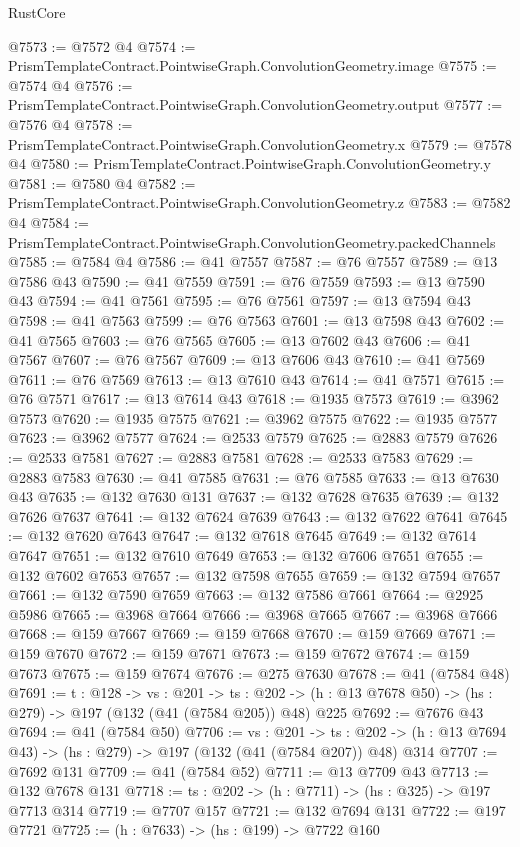 \begin{lexlean}{RustCore}
\begin{coremodule}
@7573 := @7572 @4
@7574 := PrismTemplateContract.PointwiseGraph.ConvolutionGeometry.image
@7575 := @7574 @4
@7576 := PrismTemplateContract.PointwiseGraph.ConvolutionGeometry.output
@7577 := @7576 @4
@7578 := PrismTemplateContract.PointwiseGraph.ConvolutionGeometry.x
@7579 := @7578 @4
@7580 := PrismTemplateContract.PointwiseGraph.ConvolutionGeometry.y
@7581 := @7580 @4
@7582 := PrismTemplateContract.PointwiseGraph.ConvolutionGeometry.z
@7583 := @7582 @4
@7584 := PrismTemplateContract.PointwiseGraph.ConvolutionGeometry.packedChannels
@7585 := @7584 @4
@7586 := @41 @7557
@7587 := @76 @7557
@7589 := @13 @7586 @43
@7590 := @41 @7559
@7591 := @76 @7559
@7593 := @13 @7590 @43
@7594 := @41 @7561
@7595 := @76 @7561
@7597 := @13 @7594 @43
@7598 := @41 @7563
@7599 := @76 @7563
@7601 := @13 @7598 @43
@7602 := @41 @7565
@7603 := @76 @7565
@7605 := @13 @7602 @43
@7606 := @41 @7567
@7607 := @76 @7567
@7609 := @13 @7606 @43
@7610 := @41 @7569
@7611 := @76 @7569
@7613 := @13 @7610 @43
@7614 := @41 @7571
@7615 := @76 @7571
@7617 := @13 @7614 @43
@7618 := @1935 @7573
@7619 := @3962 @7573
@7620 := @1935 @7575
@7621 := @3962 @7575
@7622 := @1935 @7577
@7623 := @3962 @7577
@7624 := @2533 @7579
@7625 := @2883 @7579
@7626 := @2533 @7581
@7627 := @2883 @7581
@7628 := @2533 @7583
@7629 := @2883 @7583
@7630 := @41 @7585
@7631 := @76 @7585
@7633 := @13 @7630 @43
@7635 := @132 @7630 @131
@7637 := @132 @7628 @7635
@7639 := @132 @7626 @7637
@7641 := @132 @7624 @7639
@7643 := @132 @7622 @7641
@7645 := @132 @7620 @7643
@7647 := @132 @7618 @7645
@7649 := @132 @7614 @7647
@7651 := @132 @7610 @7649
@7653 := @132 @7606 @7651
@7655 := @132 @7602 @7653
@7657 := @132 @7598 @7655
@7659 := @132 @7594 @7657
@7661 := @132 @7590 @7659
@7663 := @132 @7586 @7661
@7664 := @2925 @5986
@7665 := @3968 @7664
@7666 := @3968 @7665
@7667 := @3968 @7666
@7668 := @159 @7667
@7669 := @159 @7668
@7670 := @159 @7669
@7671 := @159 @7670
@7672 := @159 @7671
@7673 := @159 @7672
@7674 := @159 @7673
@7675 := @159 @7674
@7676 := @275 @7630
@7678 := @41 (@7584 @48)
@7691 := {t : @128} ->
  {vs : @201} ->
  {ts : @202} -> (h : @13 @7678 @50) -> (hs : @279) -> @197 (@132 (@41 (@7584 @205)) @48) @225
@7692 := @7676 @43
@7694 := @41 (@7584 @50)
@7706 := {vs : @201} ->
  {ts : @202} -> (h : @13 @7694 @43) -> (hs : @279) -> @197 (@132 (@41 (@7584 @207)) @48) @314
@7707 := @7692 @131
@7709 := @41 (@7584 @52)
@7711 := @13 @7709 @43
@7713 := @132 @7678 @131
@7718 := {ts : @202} -> (h : @7711) -> (hs : @325) -> @197 @7713 @314
@7719 := @7707 @157
@7721 := @132 @7694 @131
@7722 := @197 @7721
@7725 := (h : @7633) -> (hs : @199) -> @7722 @160

\end{coremodule}
\end{lexlean}
